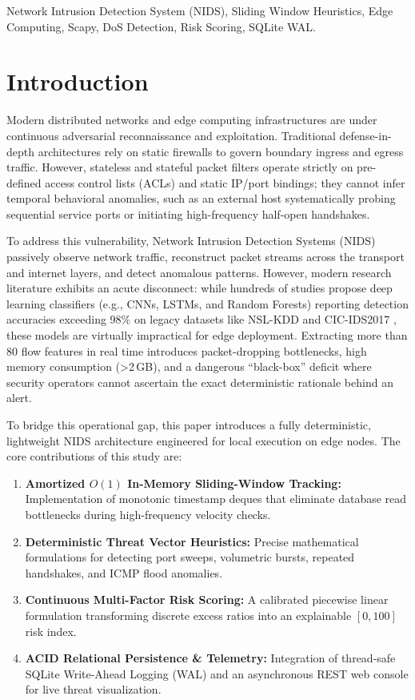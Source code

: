 \documentclass[conference]{IEEEtran}
\begin{document}
\begin{IEEEkeywords}
Network Intrusion Detection System (NIDS), Sliding Window Heuristics, Edge Computing, Scapy, DoS Detection, Risk Scoring, SQLite WAL.
\end{IEEEkeywords}

\section{Introduction}
Modern distributed networks and edge computing infrastructures are under continuous adversarial reconnaissance and exploitation. Traditional defense-in-depth architectures rely on static firewalls to govern boundary ingress and egress traffic. However, stateless and stateful packet filters operate strictly on pre-defined access control lists (ACLs) and static IP/port bindings; they cannot infer temporal behavioral anomalies, such as an external host systematically probing sequential service ports or initiating high-frequency half-open handshakes.

To address this vulnerability, Network Intrusion Detection Systems (NIDS) passively observe network traffic, reconstruct packet streams across the transport and internet layers, and detect anomalous patterns. However, modern research literature exhibits an acute disconnect: while hundreds of studies propose deep learning classifiers (e.g., CNNs, LSTMs, and Random Forests) reporting detection accuracies exceeding 98\% on legacy datasets like NSL-KDD and CIC-IDS2017 \cite{tavallaee2009detailed, sharafaldin2018toward}, these models are virtually impractical for edge deployment. Extracting more than 80 flow features in real time introduces packet-dropping bottlenecks, high memory consumption (>2\,GB), and a dangerous ``black-box'' deficit where security operators cannot ascertain the exact deterministic rationale behind an alert.

To bridge this operational gap, this paper introduces a fully deterministic, lightweight NIDS architecture engineered for local execution on edge nodes. The core contributions of this study are:
\begin{enumerate}
    \item \textbf{Amortized $O(1)$ In-Memory Sliding-Window Tracking:} Implementation of monotonic timestamp deques that eliminate database read bottlenecks during high-frequency velocity checks.
    \item \textbf{Deterministic Threat Vector Heuristics:} Precise mathematical formulations for detecting port sweeps, volumetric bursts, repeated handshakes, and ICMP flood anomalies.
    \item \textbf{Continuous Multi-Factor Risk Scoring:} A calibrated piecewise linear formulation transforming discrete excess ratios into an explainable $[0, 100]$ risk index.
    \item \textbf{ACID Relational Persistence \& Telemetry:} Integration of thread-safe SQLite Write-Ahead Logging (WAL) and an asynchronous REST web console for live threat visualization.
\end{enumerate}
\end{document}
